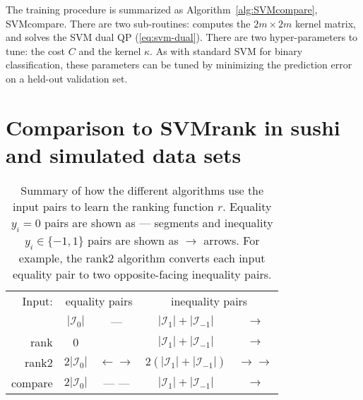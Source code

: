 \documentclass[twoside,11pt]{article}
\begin{document}
The training procedure is summarized as
Algorithm~\ref{alg:SVMcompare}, SVMcompare.
There are two sub-routines:  computes
the $2m\times 2m$ kernel matrix, and  solves the SVM
dual QP (\ref{eq:svm-dual}). There are two hyper-parameters to tune:
the cost $C$ and the kernel $\kappa$. As with standard SVM for binary
classification, these parameters can be tuned by minimizing the
prediction error on a held-out validation set.

\section{Comparison to SVMrank in sushi and simulated data sets}
\label{sec:results}



\begin{table}[b!]
  \centering
  \begin{tabular}{r|cc|cc|}
Input:&    \multicolumn{2}{c|}{equality pairs}
&    \multicolumn{2}{c|}{inequality pairs}\\
    & $|\mathcal I_0|$ %
    & --- 
    & $|\mathcal I_1|+|\mathcal I_{-1}|$ %
    & $\rightarrow$
    \\
    \hline
    rank 
    & 0 
    & 
    & $|\mathcal I_1|+|\mathcal I_{-1}|$ 
    & $\rightarrow$ 
    \\
    \hline
    rank2 
    & $2|\mathcal I_0|$ 
    & $\leftarrow \rightarrow$
    & $2(|\mathcal I_1|+|\mathcal I_{-1}|)$ 
    & $\rightarrow \rightarrow$
    \\
    \hline
    compare 
    & $2|\mathcal I_0|$ 
    & --- --- 
    & $|\mathcal I_1|+|\mathcal I_{-1}|$ 
    & $\rightarrow$\\
    \hline
  \end{tabular}
  \caption{\label{tab:models}
    Summary of how the different algorithms 
    use the input pairs to learn the ranking 
    function $r$. Equality $y_i=0$ pairs are shown as ---  
    segments and inequality $y_i\in\{-1,1\}$ pairs 
    are shown as $\rightarrow$  arrows. For example, 
    the rank2 algorithm converts each input equality pair
    to two opposite-facing inequality pairs.}
\end{table}
\end{document}
